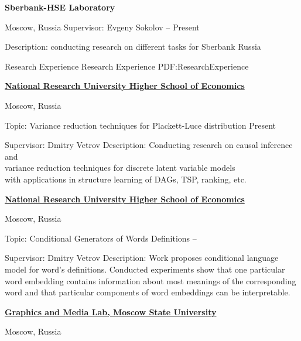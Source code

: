 \documentclass[letterpaper,MMMyyyy,nonstopmode]{simpleresumecv}
\begin{document}
\begin{Body}
\Gap

\Entry
\textbf{Sberbank-HSE Laboratory}
\par
Moscow, Russia
\BulletItem
Supervisor: Evgeny Sokolov
\hfill
{} --
Present
\begin{Detail}
\SubBulletItem
Description: conducting research on different tasks for Sberbank Russia
\end{Detail}


\Section
{Research Experience}
{Research Experience}
{PDF:ResearchExperience}

\Entry
\href{https://www.hse.ru/en/}
{\textbf{National Research University Higher School of Economics}}
\par
Moscow, Russia

\Gap
\BulletItem
Topic: Variance reduction techniques for Plackett-Luce distribution
\hfill
Present
\begin{Detail}
\SubBulletItem
Supervisor:
Dmitry Vetrov
\SubBulletItem
Description:
Conducting research on causal inference and\\ variance reduction techniques for discrete latent variable models\\ with applications in structure learning of DAGs, TSP, ranking, etc.
\end{Detail}

\Entry
\href{https://www.hse.ru/en/}
{\textbf{National Research University Higher School of Economics}}
\par
Moscow, Russia

\Gap
\BulletItem
Topic: Conditional Generators of Words Definitions
\hfill
{} --
\begin{Detail}
\SubBulletItem
Supervisor:
Dmitry Vetrov
\SubBulletItem
Description:
Work proposes conditional language model for word’s definitions. \newline
Conducted experiments show that one particular word embedding contains \newline
information about most meanings of the corresponding word and that \newline
particular components of word embeddings can be interpretable.
\end{Detail}

\Gap

\Entry
\href{http://graphics.cs.msu.ru/en}
{\textbf{Graphics and Media Lab, Moscow State University}}
\par
Moscow, Russia


\end{Body}
\end{document}
